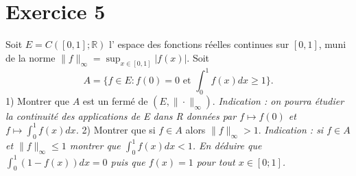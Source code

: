 \documentclass{article}
\begin{document}
\section{Exercice 5}
Soit $E = C([0,1]; \mathbb{R})$ l' espace des fonctions réelles continues sur $[0, 1]$, muni de la norme $\|f\|_{\infty} = \sup_{x\in[0,1]} |f(x)|$. Soit
\[ A = \{f \in E : f(0) = 0 \text{ et } \int_0^1 f(x)dx \ge 1\}. \]
1) Montrer que $A$ est un fermé de $(E, \|\cdot\|_{\infty})$.
\textit{Indication : on pourra étudier la continuité des applications de E dans R données par $f \mapsto f(0)$ et $f \mapsto \int_0^1 f(x)dx$.}
2) Montrer que si $f \in A$ alors $\|f\|_{\infty} > 1$.
\textit{Indication : si $f \in A$ et $\|f\|_{\infty} \le 1$ montrer que $\int_0^1 f(x)dx < 1$. En déduire que $\int_0^1 (1 - f(x))dx = 0$ puis que $f(x) = 1$ pour tout $x \in [0; 1]$.}
\end{document}
